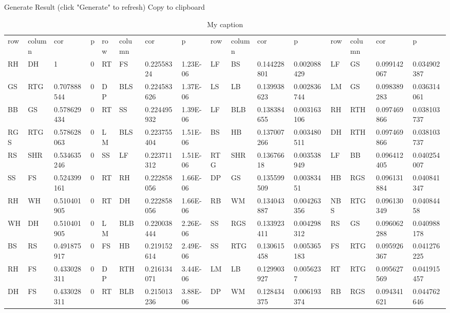  Generate
Result (click "Generate" to refresh) Copy to clipboard
\begin{table}[]
\centering
\caption{My caption}
\label{my-label}
\begin{tabular}{llllllllllllllll}
row & column & cor         & p        & row & column & cor         & p           & row & column & cor         & p           & row & column & cor          & p           \\
RH  & DH     & 1           & 0        & RT  & FS     & 0.22558324  & 1.23E-06    & LF  & BS     & 0.144228801 & 0.002088429 & LF  & GS     & 0.099142067  & 0.034902387 \\
GS  & RTG    & 0.707888544 & 0        & DP  & BLS    & 0.224583626 & 1.37E-06    & LS  & LB     & 0.139938623 & 0.002836744 & LM  & GS     & 0.098389283  & 0.036314061 \\
BB  & GS     & 0.578629434 & 0        & RT  & SS     & 0.224495932 & 1.39E-06    & LF  & BLB    & 0.138384655 & 0.003163106 & RH  & RTH    & 0.097469866  & 0.038103737 \\
RGS & RTG    & 0.578628063 & 0        & LM  & BLS    & 0.223755404 & 1.51E-06    & BS  & HB     & 0.137007266 & 0.003480511 & DH  & RTH    & 0.097469866  & 0.038103737 \\
RS  & SHR    & 0.534635246 & 0        & SS  & LF     & 0.223711312 & 1.51E-06    & RTG & SHR    & 0.13676618  & 0.003538949 & LF  & BB     & 0.096412405  & 0.040254007 \\
SS  & FS     & 0.524399161 & 0        & RT  & RH     & 0.222858056 & 1.66E-06    & DP  & GS     & 0.135599509 & 0.00383451  & HB  & RGS    & 0.096131884  & 0.040841347 \\
RH  & WH     & 0.510401905 & 0        & RT  & DH     & 0.222858056 & 1.66E-06    & RB  & WM     & 0.134043887 & 0.004263356 & NBS & RTG    & 0.096130349  & 0.04084458  \\
WH  & DH     & 0.510401905 & 0        & LM  & BLB    & 0.220038444 & 2.26E-06    & SS  & RGS    & 0.133923411 & 0.004298312 & RS  & GS     & 0.096062288  & 0.040988178 \\
BS  & RS     & 0.491875917 & 0        & FS  & HB     & 0.219152614 & 2.49E-06    & SS  & RTG    & 0.130615458 & 0.005365183 & FS  & RTG    & 0.095926367  & 0.041276225 \\
RH  & FS     & 0.433028311 & 0        & DP  & RTH    & 0.216134071 & 3.44E-06    & LM  & LB     & 0.129903927 & 0.0056237   & RT  & RTG    & 0.095627569  & 0.041915457 \\
DH  & FS     & 0.433028311 & 0        & RT  & BLB    & 0.215013236 & 3.88E-06    & DP  & WM     & 0.128434375 & 0.006193374 & RB  & RGS    & 0.094341621  & 0.044762646 \\

\end{tabular}
\end{table}
